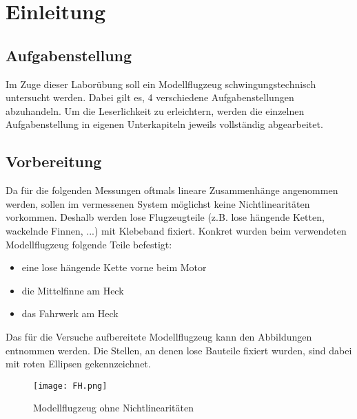 \chapter{Einleitung}
\label{sec: Einleitung}

\section{Aufgabenstellung}
    Im Zuge dieser Laborübung soll ein Modellflugzeug schwingungstechnisch
    untersucht werden. Dabei gilt es, 4 verschiedene Aufgabenstellungen
    abzuhandeln. Um die Leserlichkeit zu erleichtern, werden die einzelnen
    Aufgabenstellung in eigenen Unterkapiteln jeweils vollständig abgearbeitet.

\section{Vorbereitung}
    Da für die folgenden Messungen oftmals lineare Zusammenhänge angenommen
    werden, sollen im vermessenen System möglichst keine Nichtlinearitäten
    vorkommen. Deshalb werden lose Flugzeugteile (z.B. lose hängende Ketten,
    wackelnde Finnen, ...) mit Klebeband fixiert.
    Konkret wurden beim verwendeten Modellflugzeug folgende Teile befestigt:

    \begin{itemize}
        \item eine lose hängende Kette vorne beim Motor
        \item die Mittelfinne am Heck
        \item das Fahrwerk am Heck
    \end{itemize}

    \noindent
    Das für die Versuche aufbereitete Modellflugzeug kann den Abbildungen
    entnommen werden. Die Stellen, an denen lose Bauteile fixiert wurden, sind
    dabei mit roten Ellipsen gekennzeichnet.

    \begin{figure}[H]
        \centering
        \texttt{[image: FH.png]}
        \caption{Modellflugzeug ohne Nichtlinearitäten}
        \label{fig: Modellflugzeug_vorbereitet}
    \end{figure}
